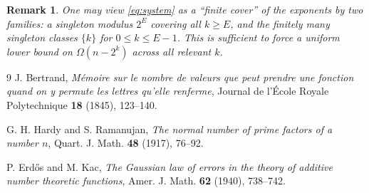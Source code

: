 \documentclass[11pt]{article}
\newtheorem{remark}{Remark}
\numberwithin{equation}{section}
\begin{document}
\begin{remark}
One may view \eqref{eq:system} as a ``finite cover'' of the exponents by two families:
a singleton modulus $2^E$ covering all $k\ge E$, and the finitely many singleton classes
$\{k\}$ for $0\le k\le E-1$.
This is sufficient to force a uniform lower bound on $\Omega(n-2^k)$ across all relevant $k$.
\end{remark}


\begin{thebibliography}{9}
J. Bertrand, \emph{M\'emoire sur le nombre de valeurs que peut prendre une fonction quand on y permute les lettres qu'elle renferme},
Journal de l'\'Ecole Royale Polytechnique \textbf{18} (1845), 123--140.

G. H. Hardy and S. Ramanujan, \emph{The normal number of prime factors of a number $n$},
Quart. J. Math. \textbf{48} (1917), 76--92.

P. Erd\H{o}s and M. Kac, \emph{The Gaussian law of errors in the theory of additive number theoretic functions},
Amer. J. Math. \textbf{62} (1940), 738--742.
\end{thebibliography}
\end{document}
